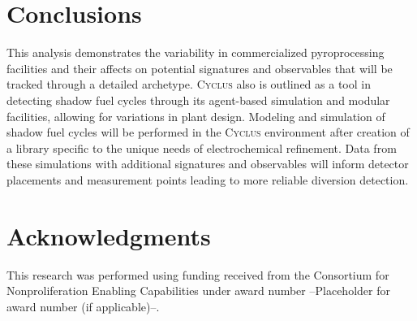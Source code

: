 \documentclass{anstrans}
\newcommand{\Cyclus}{\textsc{Cyclus}\xspace}%
\begin{document}
\section{Conclusions}
This analysis demonstrates the variability in commercialized pyroprocessing facilities and their affects on potential 
signatures and observables that will be tracked through a detailed archetype. \Cyclus also is outlined as a tool in 
detecting shadow fuel cycles through its agent-based simulation and modular facilities, allowing for variations in 
plant design. Modeling and simulation of shadow fuel cycles will be performed in the \Cyclus environment after 
creation of a library specific to the unique needs of electrochemical refinement. Data from these simulations with 
additional signatures and observables will inform detector placements and measurement points leading to more 
reliable diversion detection.

\section{Acknowledgments}
This research was performed using funding received from the Consortium for Nonproliferation Enabling Capabilities under award number 
--Placeholder for award number (if applicable)--.



\end{document}
